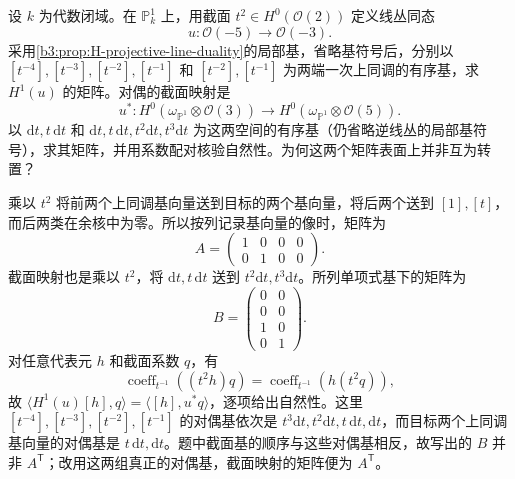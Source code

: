 \begin{exercise}\label{b3:ex:H-duality-matrix}
	设 \(k\) 为代数闭域。在 \(\mathbb P_k^1\) 上，用截面 \(t^2\in H^0(\mathcal O(2))\) 定义线丛同态
	\[
		u:\mathcal O(-5)\longrightarrow\mathcal O(-3).
	\]
	采用\cref{b3:prop:H-projective-line-duality}的局部基，省略基符号后，分别以 \([t^{-4}],[t^{-3}],[t^{-2}],[t^{-1}]\) 和 \([t^{-2}],[t^{-1}]\) 为两端一次上同调的有序基，求 \(H^1(u)\) 的矩阵。对偶的截面映射是
	\[
		u^*:H^0(\omega_{\mathbb P^1}\otimes\mathcal O(3))
		\longrightarrow H^0(\omega_{\mathbb P^1}\otimes\mathcal O(5)).
	\]
	以 \(\mathrm{d}t,t\,\mathrm{d}t\) 和 \(\mathrm{d}t,t\,\mathrm{d}t,t^2\mathrm{d}t,t^3\mathrm{d}t\) 为这两空间的有序基（仍省略逆线丛的局部基符号），求其矩阵，并用系数配对核验自然性。为何这两个矩阵表面上并非互为转置？
\end{exercise}
\begin{solution}
	乘以 \(t^2\) 将前两个上同调基向量送到目标的两个基向量，将后两个送到 \([1],[t]\)，而后两类在余核中为零。所以按列记录基向量的像时，矩阵为
	\[
		A=\begin{pmatrix}1&0&0&0\\0&1&0&0\end{pmatrix}.
	\]
	截面映射也是乘以 \(t^2\)，将 \(\mathrm{d}t,t\,\mathrm{d}t\) 送到 \(t^2\mathrm{d}t,t^3\mathrm{d}t\)。所列单项式基下的矩阵为
	\[
		B=\begin{pmatrix}0&0\\0&0\\1&0\\0&1\end{pmatrix}.
	\]
	对任意代表元 \(h\) 和截面系数 \(q\)，有
	\[
		\operatorname{coeff}_{t^{-1}}((t^2h)q)
		=\operatorname{coeff}_{t^{-1}}(h(t^2q)),
	\]
	故 \(\langle H^1(u)[h],q\rangle=\langle[h],u^*q\rangle\)，逐项给出自然性。这里 \([t^{-4}],[t^{-3}],[t^{-2}],[t^{-1}]\) 的对偶基依次是 \(t^3\mathrm{d}t,t^2\mathrm{d}t,t\,\mathrm{d}t,\mathrm{d}t\)，而目标两个上同调基向量的对偶基是 \(t\,\mathrm{d}t,\mathrm{d}t\)。题中截面基的顺序与这些对偶基相反，故写出的 \(B\) 并非 \(A^{\mathsf T}\)；改用这两组真正的对偶基，截面映射的矩阵便为 \(A^{\mathsf T}\)。
\end{solution}

